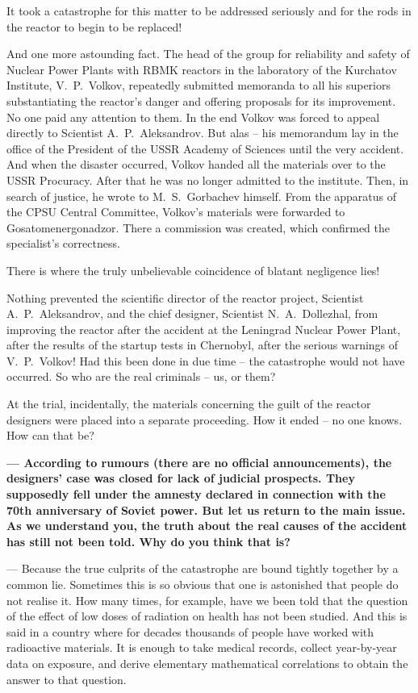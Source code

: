 \documentclass[openright]{bookest}
\begin{document}
It took a catastrophe for this matter to be addressed seriously and for the rods in the reactor to begin to be replaced!

And one more astounding fact. The head of the group for reliability and safety of Nuclear Power Plants with RBMK reactors in the laboratory of the Kurchatov Institute, V.~P.~Volkov, repeatedly submitted memoranda to all his superiors substantiating the reactor's danger and offering proposals for its improvement. No one paid any attention to them. In the end Volkov was forced to appeal directly to Scientist A.~P.~Aleksandrov. But alas -- his memorandum lay in the office of the President of the USSR Academy of Sciences until the very accident. And when the disaster occurred, Volkov handed all the materials over to the USSR Procuracy. After that he was no longer admitted to the institute. Then, in search of justice, he wrote to M.~S.~Gorbachev himself. From the apparatus of the CPSU Central Committee, Volkov's materials were forwarded to Gosatomenergonadzor. There a commission was created, which confirmed the specialist's correctness.

There is where the truly unbelievable coincidence of blatant negligence lies!

Nothing prevented the scientific director of the reactor project, Scientist A.~P.~Aleksandrov, and the chief designer, Scientist N.~A.~Dollezhal, from improving the reactor after the accident at the Leningrad Nuclear Power Plant, after the results of the startup tests in Chernobyl, after the serious warnings of V.~P.~Volkov! Had this been done in due time -- the catastrophe would not have occurred. So who are the real criminals -- us, or them?

At the trial, incidentally, the materials concerning the guilt of the reactor designers were placed into a separate proceeding. How it ended -- no one knows. How can that be?

\medskip

\textbf{--- According to rumours (there are no official announcements), the designers' case was closed for lack of judicial prospects. They supposedly fell under the amnesty declared in connection with the 70th anniversary of Soviet power. But let us return to the main issue. As we understand you, the truth about the real causes of the accident has still not been told. Why do you think that is?}

\noindent
--- Because the true culprits of the catastrophe are bound tightly together by a common lie. Sometimes this is so obvious that one is astonished that people do not realise it. How many times, for example, have we been told that the question of the effect of low doses of radiation on health has not been studied. And this is said in a country where for decades thousands of people have worked with radioactive materials. It is enough to take medical records, collect year-by-year data on exposure, and derive elementary mathematical correlations to obtain the answer to that question.
\end{document}
